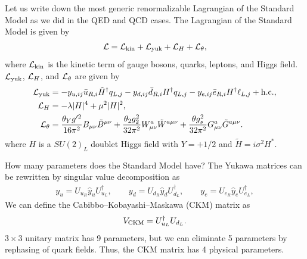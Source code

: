 \documentclass[11pt,a4paper]{article}
\begin{document}
Let us write down the most generic renormalizable Lagrangian of the Standard Model as we did in the QED and QCD cases. The Lagrangian of the Standard Model is given by
\begin{align}
    {\cal L} = {\cal L}_{\rm kin} + {\cal L}_{\rm yuk} + {\cal L}_H + {\cal L}_\theta,
\end{align}
where ${\cal L_{\rm kin}}$ is the kinetic term of gauge bosons, quarks, leptons, and Higgs field. ${\cal L}_{\rm yuk}$, ${\cal L}_H$, and ${\cal L}_\theta$ are given by
\begin{align}
    {\cal L}_{\rm yuk} &= -y_{u,ij} \bar u_{R,i} \tilde H^\dagger q_{L,j}  - y_{d,ij} \bar d_{R,i} H^\dagger q_{L,j} - y_{e,ij} \bar e_{R,i} H^\dagger \ell_{L,j} + {\rm h.c.}, \label{eq:SM yukawa}\\
    {\cal L}_H &= -\lambda|H|^4 + \mu^2 |H|^2, \\
    {\cal L}_\theta &= \frac{\theta_Y g'^2}{16\pi^2} B_{\mu\nu} \tilde B^{\mu\nu} + \frac{\theta_2 g_2^2}{32\pi^2} W_{\mu\nu}^a \tilde W^{a\mu\nu} + \frac{\theta g_s^2}{32\pi^2} G_{\mu\nu}^a \tilde G^{a\mu\nu}.
\end{align}
where $H$ is a $SU(2)_L$ doublet Higgs field with $Y=+1/2$ and $\tilde H = i\sigma^2 H^*$.

How many parameters does the Standard Model have? The Yukawa matrices can be rewritten by singular value decomposition as
\begin{align}
    y_u = U_{u_R} \hat y_u U_{u_L}^\dagger, \qquad
    y_d = U_{d_R} \hat y_d U_{d_L}^\dagger, \qquad
    y_e = U_{e_R} \hat y_e U_{e_L}^\dagger,
\end{align}
We can define the Cabibbo--Kobayashi--Maskawa (CKM) matrix as
\begin{align}
    V_{\rm CKM} = U_{u_L}^\dagger U_{d_L}.
\end{align}
$3\times 3$ unitary matrix has 9 parameters, but we can eliminate 5 parameters by rephasing of quark fields. Thus, the CKM matrix has 4 physical parameters.
\end{document}
